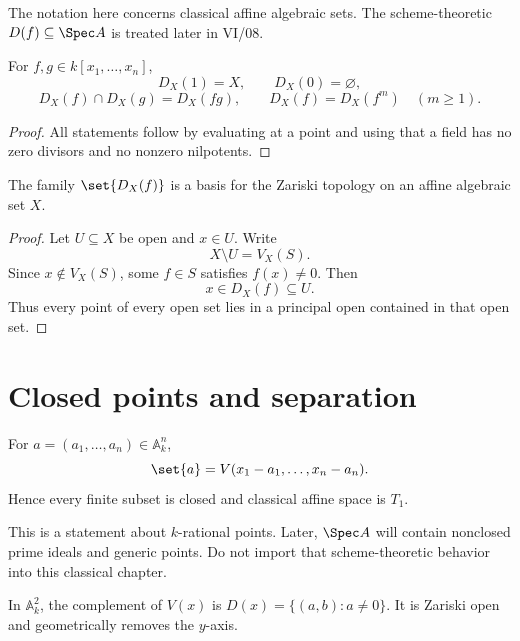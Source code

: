 The notation here concerns classical affine algebraic sets.  The scheme-theoretic
\(D(f)\subseteq\Spec A\) is treated later in VI/08.

\begin{proposition}
\label{prop:vi02-principal-calculus}
For \(f,g\in k[x_1,\dots,x_n]\),
\[
D_X(1)=X,\qquad D_X(0)=\varnothing,
\]
\[
D_X(f)\cap D_X(g)=D_X(fg),
\qquad
D_X(f)=D_X(f^m)\quad(m\ge1).
\]
\end{proposition}

\begin{proof}
All statements follow by evaluating at a point and using that a field has no zero divisors
and no nonzero nilpotents.
\end{proof}

\begin{theorem}
\label{thm:vi02-principal-basis}
The family \(\set{D_X(f)}\) is a basis for the Zariski topology on an affine algebraic set
\(X\).
\end{theorem}

\begin{proof}
Let \(U\subseteq X\) be open and \(x\in U\).  Write
\[
X\setminus U=V_X(S).
\]
Since \(x\notin V_X(S)\), some \(f\in S\) satisfies \(f(x)\neq0\).  Then
\[
x\in D_X(f)\subseteq U.
\]
Thus every point of every open set lies in a principal open contained in that open set.
\end{proof}

\section{Closed points and separation}
\label{sec:vi02-separation}

\begin{proposition}
For \(a=(a_1,\dots,a_n)\in\mathbb A_k^n\),
\[
\set{a}=V(x_1-a_1,\dots,x_n-a_n).
\]
Hence every finite subset is closed and classical affine space is \(T_1\).
\end{proposition}

\begin{remark}
This is a statement about \(k\)-rational points.  Later, \(\Spec A\) will contain nonclosed
prime ideals and generic points.  Do not import that scheme-theoretic behavior into this
classical chapter.
\end{remark}

\begin{example}\label{ex:vi02-expand-02}
In $\mathbb A^2_k$, the complement of $V(x)$ is $D(x)=\{(a,b):a\ne0\}$.  It is Zariski open and geometrically removes the $y$-axis.
\end{example}
